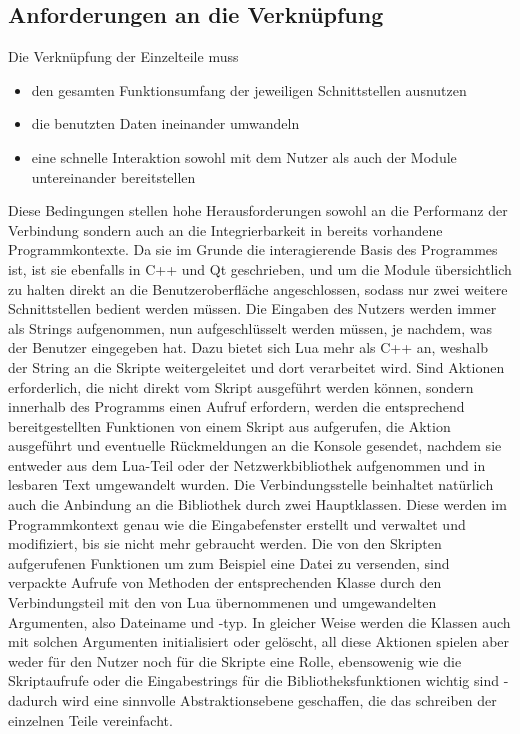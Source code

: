 \subsection{Anforderungen an die Verknüpfung}
Die Verknüpfung der Einzelteile muss
\begin{itemize}
\item den gesamten Funktionsumfang der jeweiligen Schnittstellen ausnutzen
\item die benutzten Daten ineinander umwandeln
\item eine schnelle Interaktion sowohl mit dem Nutzer als auch der Module untereinander bereitstellen
\end{itemize}
Diese Bedingungen stellen hohe Herausforderungen sowohl an die Performanz der Verbindung sondern auch an die Integrierbarkeit in bereits vorhandene Programmkontexte.
Da sie im Grunde die interagierende Basis des Programmes ist, ist sie ebenfalls in C++ und Qt geschrieben, und um die Module übersichtlich zu halten direkt an die Benutzeroberfläche angeschlossen, sodass nur zwei weitere Schnittstellen bedient werden müssen.
Die Eingaben des Nutzers werden immer als Strings aufgenommen, nun aufgeschlüsselt werden müssen, je nachdem, was der Benutzer eingegeben hat.
Dazu bietet sich Lua mehr als C++ an, weshalb der String an die Skripte weitergeleitet und dort verarbeitet wird.
Sind Aktionen erforderlich, die nicht direkt vom Skript ausgeführt werden können, sondern innerhalb des Programms einen Aufruf erfordern, werden die entsprechend bereitgestellten Funktionen von einem Skript aus aufgerufen, die Aktion ausgeführt und eventuelle Rückmeldungen an die Konsole gesendet, nachdem sie entweder aus dem Lua-Teil oder der Netzwerkbibliothek aufgenommen und in lesbaren Text umgewandelt wurden.
Die Verbindungsstelle beinhaltet natürlich auch die Anbindung an die Bibliothek durch zwei Hauptklassen.
Diese werden im Programmkontext genau wie die Eingabefenster erstellt und verwaltet und modifiziert, bis sie nicht mehr gebraucht werden.
Die von den Skripten aufgerufenen Funktionen um zum Beispiel eine Datei zu versenden, sind verpackte Aufrufe von Methoden der entsprechenden Klasse durch den Verbindungsteil mit den von Lua übernommenen und umgewandelten Argumenten, also Dateiname und -typ.
In gleicher Weise werden die Klassen auch mit solchen Argumenten initialisiert oder gelöscht, all diese Aktionen spielen aber weder für den Nutzer noch für die Skripte eine Rolle, ebensowenig wie die Skriptaufrufe oder die Eingabestrings für die Bibliotheksfunktionen wichtig sind - dadurch wird eine sinnvolle Abstraktionsebene geschaffen, die das schreiben der einzelnen Teile vereinfacht.